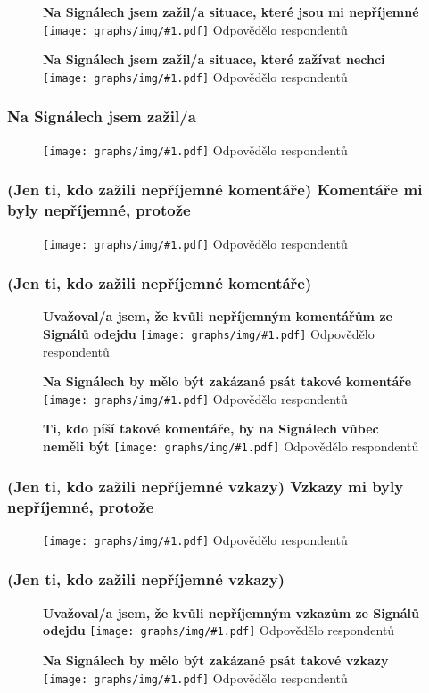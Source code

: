 \documentclass[12pt, a4paper, twoside]{article}
\newcommand{\answercount}[1]{Odpovědělo  respondentů}
\newcommand{\includegraph}[2]{
  \begin{figure}[H]
    \centering
    \textbf{#2}
    \texttt{[image: graphs/img/\#1.pdf]}
    \answercount{#1}
  \end{figure}
}
\begin{document}
\includegraph{ostatni_neprijemne_neprijemne_situace}{Na Signálech jsem zažil/a situace, které jsou mi nepříjemné}

\includegraph{ostatni_neprijemne_zazivat_nechci}{Na Signálech jsem zažil/a situace, které zažívat nechci}

\subsubsection{Na Signálech jsem zažil/a}

\includegraph{neprijemne_co}{}

\subsubsection{(Jen ti, kdo zažili nepříjemné komentáře) Komentáře mi byly nepříjemné, protože}

\includegraph{neprijemne_komentare_protoze}{}

\subsubsection{(Jen ti, kdo zažili nepříjemné komentáře)}

\includegraph{neprijemne_komentare_zvazoval_odchod}{Uvažoval/a jsem, že kvůli nepříjemným komentářům ze Signálů odejdu}

\includegraph{neprijemne_komentare_zakazat}{Na Signálech by mělo být zakázané psát takové komentáře}

\includegraph{neprijemne_komentare_pisatele_pryc}{Ti, kdo píší takové komentáře, by na Signálech vůbec neměli být}

\subsubsection{(Jen ti, kdo zažili nepříjemné vzkazy) Vzkazy mi byly nepříjemné, protože}

\includegraph{neprijemne_vzkazy_protoze}{}

\subsubsection{(Jen ti, kdo zažili nepříjemné vzkazy)}

\includegraph{neprijemne_vzkazy_zvazoval_odchod}{Uvažoval/a jsem, že kvůli nepříjemným vzkazům ze Signálů odejdu}

\includegraph{neprijemne_vzkazy_zakazat}{Na Signálech by mělo být zakázané psát takové vzkazy}
\end{document}
